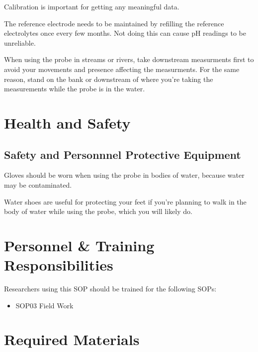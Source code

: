 \documentclass[12pt]{../SOP3}\usepackage[]{graphicx}\usepackage[]{color}
\begin{document}
\NP Calibration is important for getting any meaningful data. 


\NP The reference electrode needs to be maintained by refilling the reference electrolytes once every few months. Not doing this can cause pH readings to be unreliable. 

\NP When using the probe in streams or rivers, take downstream measurments first to avoid your movements and presence affecting the measurments. For the same reason, stand on the bank or downstream of where you're taking the measurements while the probe is in the water.  

\section{Health and Safety}

\subsection{Safety and Personnnel Protective Equipment}

\NP Gloves should be worn when using the probe in bodies of water, because water may be contaminated. 

\NP Water shoes are useful for protecting your feet if you're planning to walk in the body of water while using the probe, which you will likely do. 

\section{Personnel \& Training Responsibilities}

Researchers using this SOP should be trained for the following SOPs:

\begin{itemize}
  \item SOP03 Field Work
\end{itemize}

\section{Required Materials}

\end{document}
